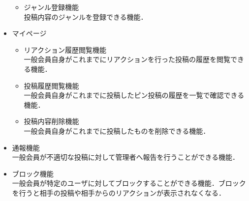 \begin{itemize}[itemsep=10pt]
\begin{itemize}[itemsep=10pt]
        \item ジャンル登録機能 \mbox{}\\
        投稿内容のジャンルを登録できる機能．
    \end{itemize}
    \item マイページ
    \begin{itemize}[itemsep=10pt]
        \item リアクション履歴閲覧機能 \mbox{}\\
        一般会員自身がこれまでにリアクションを行った投稿の履歴を閲覧できる機能．
        \item 投稿履歴閲覧機能 \mbox{}\\
        一般会員自身がこれまでに投稿したピン投稿の履歴を一覧で確認できる機能．
        \item 投稿内容削除機能 \mbox{}\\
        一般会員自身がこれまでに投稿したものを削除できる機能．
    \end{itemize}
    \item 通報機能 \mbox{} \\
    一般会員が不適切な投稿に対して管理者へ報告を行うことができる機能．
    \item ブロック機能 \mbox{} \\
    一般会員が特定のユーザに対してブロックすることができる機能．ブロックを行うと相手の投稿や相手からのリアクションが表示されなくなる．
\end{itemize}


